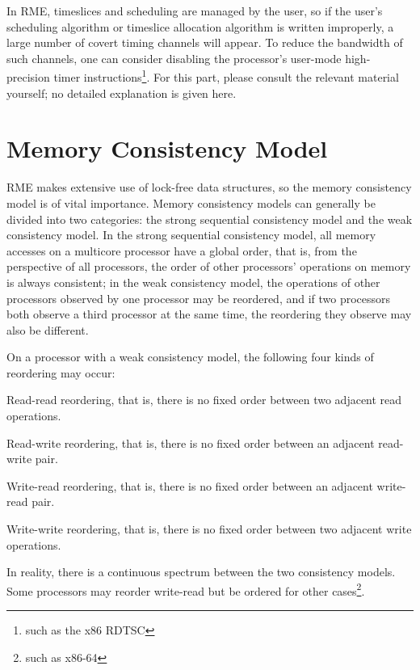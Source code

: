 In RME, timeslices and scheduling are managed by the user, so if the user's scheduling algorithm or timeslice allocation algorithm is written improperly, a large number of covert timing channels will appear. To reduce the bandwidth of such channels, one can consider disabling the processor's user-mode high-precision timer instructions\footnote{such as the x86 RDTSC}. For this part, please consult the relevant material yourself; no detailed explanation is given here.

\section{Memory Consistency Model}\label{sec:9-memory-consistency-model}

RME makes extensive use of lock-free data structures, so the memory consistency model is of vital importance. Memory consistency models can generally be divided into two categories: the strong sequential consistency model and the weak consistency model. In the strong sequential consistency model, all memory accesses on a multicore processor have a global order, that is, from the perspective of all processors, the order of other processors' operations on memory is always consistent; in the weak consistency model, the operations of other processors observed by one processor may be reordered, and if two processors both observe a third processor at the same time, the reordering they observe may also be different.

On a processor with a weak consistency model, the following four kinds of reordering may occur:

Read-read reordering, that is, there is no fixed order between two adjacent read operations.

Read-write reordering, that is, there is no fixed order between an adjacent read-write pair.

Write-read reordering, that is, there is no fixed order between an adjacent write-read pair.

Write-write reordering, that is, there is no fixed order between two adjacent write operations.

In reality, there is a continuous spectrum between the two consistency models. Some processors may reorder write-read but be ordered for other cases\footnote{such as x86-64}.

